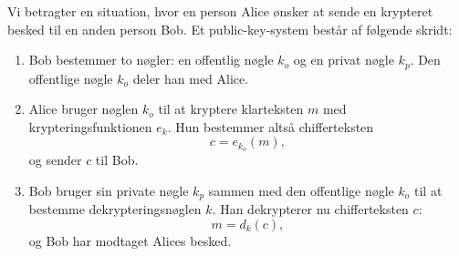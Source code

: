 \documentclass[12pt]{article}
\begin{document}
Vi betragter en situation, hvor en person Alice ønsker at sende en krypteret besked til en anden person Bob. Et public-key-system består af følgende skridt:
\begin{enumerate}[label=\roman*)]
\item Bob bestemmer to nøgler: en offentlig nøgle $k_o$ og en privat nøgle $k_p$. Den offentlige nøgle $k_o$ deler han med Alice.
\item Alice bruger nøglen $k_o$ til at kryptere klarteksten $m$ med krypteringsfunktionen $e_k.$ Hun bestemmer altså chifferteksten
\[
c = e_{k_o}(m),
\]
og sender $c$ til Bob. 
\item Bob bruger sin private nøgle $k_p$ sammen med den offentlige nøgle $k_o$ til at bestemme dekrypteringsnøglen $k$. Han dekrypterer nu chifferteksten $c$:
\[
m = d_k(c),
\]
og Bob har modtaget Alices besked. 
\end{enumerate}
\end{document}
